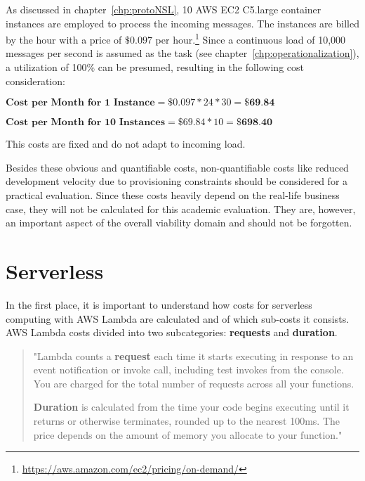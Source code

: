 As discussed in chapter~\vref{chp:protoNSL}, 10 AWS EC2 C5.large container instances are employed to process the incoming messages. The instances are billed by the hour with a price of $\$0.097$ per hour.\footnote{\url{https://aws.amazon.com/ec2/pricing/on-demand/}} Since a continuous load of 10,000 messages per second is assumed as the task (see chapter~\vref{chp:operationalization}), a utilization of 100\% can be presumed, resulting in the following cost consideration:

$\textbf{Cost per Month for 1 Instance} = \$0.097 * 24 * 30 = \textbf{\$69.84}$

$\textbf{Cost per Month for 10 Instances} = \$69.84 * 10 = \textbf{\$698.40}$

This costs are fixed and do not adapt to incoming load. 

Besides these obvious and quantifiable costs, non-quantifiable costs like reduced development velocity due to provisioning constraints should be considered for a practical evaluation. Since these costs heavily depend on the real-life business case, they will not be calculated for this academic evaluation. They are, however, an important aspect of the overall viability domain and should not be forgotten. 

\section{Serverless}\label{chp:viaSL}

In the first place, it is important to understand how costs for serverless computing with AWS Lambda are calculated and of which sub-costs it consists. AWS Lambda costs divided into two subcategories: \textbf{requests} and \textbf{duration}. 

\blockquote{
    "Lambda counts a \textbf{request} each time it starts executing in response to an event notification or invoke call, including test invokes from the console. You are charged for the total number of requests across all your functions.  
    
    \textbf{Duration} is calculated from the time your code begins executing until it returns or otherwise terminates, rounded up to the nearest 100ms. The price depends on the amount of memory you allocate to  your function."\autocite{AWSPricing}
}

